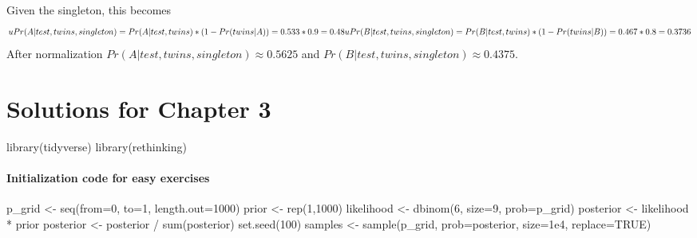 \documentclass[
]{book}
\newenvironment{Shaded}{\begin{snugshade}}{\end{snugshade}}
\newcommand{\AttributeTok}[1]{\textcolor[rgb]{0.77,0.63,0.00}{#1}}
\newcommand{\ConstantTok}[1]{\textcolor[rgb]{0.00,0.00,0.00}{#1}}
\newcommand{\DecValTok}[1]{\textcolor[rgb]{0.00,0.00,0.81}{#1}}
\newcommand{\FloatTok}[1]{\textcolor[rgb]{0.00,0.00,0.81}{#1}}
\newcommand{\FunctionTok}[1]{\textcolor[rgb]{0.00,0.00,0.00}{#1}}
\newcommand{\NormalTok}[1]{#1}
\newcommand{\OtherTok}[1]{\textcolor[rgb]{0.56,0.35,0.01}{#1}}
\newcommand{\SpecialCharTok}[1]{\textcolor[rgb]{0.00,0.00,0.00}{#1}}
\begin{document}
Given the singleton, this becomes
\[uPr(A | test, twins, singleton) = Pr(A | test, twins) * (1 - Pr(twins | A)) = 0.533 * 0.9 = 0.48\\
uPr(B | test, twins, singleton) = Pr(B | test, twins) * (1 - Pr(twins | B)) = 0.467 * 0.8 = 0.3736\]
After normalization \(Pr(A | test, twins, singleton) \approx 0.5625\) and \(Pr(B | test, twins, singleton) \approx 0.4375\).

\hypertarget{solutions-for-chapter-3}{%
\chapter{Solutions for Chapter 3}\label{solutions-for-chapter-3}}

\begin{Shaded}
\begin{Highlighting}[]
\FunctionTok{library}\NormalTok{(tidyverse)}
\FunctionTok{library}\NormalTok{(rethinking)}
\end{Highlighting}
\end{Shaded}

\hypertarget{initialization-code-for-easy-exercises}{%
\subsubsection{Initialization code for easy exercises}\label{initialization-code-for-easy-exercises}}

\begin{Shaded}
\begin{Highlighting}[]
\NormalTok{p\_grid }\OtherTok{\textless{}{-}} \FunctionTok{seq}\NormalTok{(}\AttributeTok{from=}\DecValTok{0}\NormalTok{, }\AttributeTok{to=}\DecValTok{1}\NormalTok{, }\AttributeTok{length.out=}\DecValTok{1000}\NormalTok{)}
\NormalTok{prior }\OtherTok{\textless{}{-}} \FunctionTok{rep}\NormalTok{(}\DecValTok{1}\NormalTok{,}\DecValTok{1000}\NormalTok{)}
\NormalTok{likelihood }\OtherTok{\textless{}{-}} \FunctionTok{dbinom}\NormalTok{(}\DecValTok{6}\NormalTok{, }\AttributeTok{size=}\DecValTok{9}\NormalTok{, }\AttributeTok{prob=}\NormalTok{p\_grid)}
\NormalTok{posterior }\OtherTok{\textless{}{-}}\NormalTok{ likelihood }\SpecialCharTok{*}\NormalTok{ prior}
\NormalTok{posterior }\OtherTok{\textless{}{-}}\NormalTok{ posterior }\SpecialCharTok{/} \FunctionTok{sum}\NormalTok{(posterior)}
\FunctionTok{set.seed}\NormalTok{(}\DecValTok{100}\NormalTok{)}
\NormalTok{samples }\OtherTok{\textless{}{-}} \FunctionTok{sample}\NormalTok{(p\_grid, }\AttributeTok{prob=}\NormalTok{posterior, }\AttributeTok{size=}\FloatTok{1e4}\NormalTok{, }\AttributeTok{replace=}\ConstantTok{TRUE}\NormalTok{)}
\end{Highlighting}
\end{Shaded}
\end{document}
